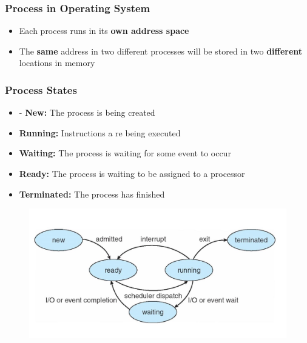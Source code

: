 \documentclass[11pt]{article}
\theoremstyle{definition}
\begin{document}
        \subsubsection{Process in Operating System}
        \begin{itemize}
            \item Each process runs in its \textbf{own address space}
            \item The \textbf{same} address in two different processes will be stored in two \textbf{different} locations in memory
        \end{itemize}
        \subsubsection{Process States}
            \begin{itemize}
                \item - \textbf{New:} The process is being created
                \item \textbf{Running:} Instructions a re being executed
                \item \textbf{Waiting:} The process is waiting for some event to occur
                \item \textbf{Ready:} The process is waiting to be assigned to a processor
                \item \textbf{Terminated:} The process has finished
            \end{itemize}
          \begin{figure}[htbp]
            \centering
                \includegraphics[width=0.80\linewidth]{Operating System/img/process_states.jpg}
                \label{fig:enter-label}
            \end{figure}
\end{document}

